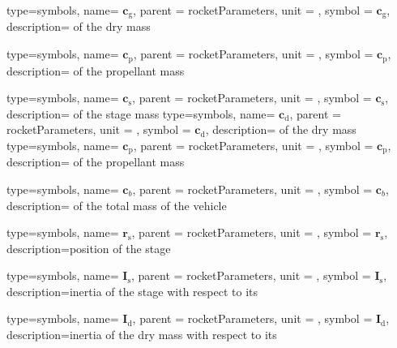 {type=symbols,
  name= \ensuremath{\mathbf{c}_\mathrm{g}},
  parent = {rocketParameters},
  unit = \unexpanded{\si{\meter}},
  symbol = \ensuremath{\mathbf{c}_\mathrm{g}},
  description={ of the dry mass}
}

{type=symbols,
  name= \ensuremath{\mathbf{c}_\mathrm{p}},
  parent = {rocketParameters},
  unit = \unexpanded{\si{\meter}},
  symbol = \ensuremath{\mathbf{c}_\mathrm{p}},
  description={ of the propellant mass}
}

{type=symbols,
  name= \ensuremath{\mathbf{c}_\mathrm{s}},
  parent = {rocketParameters},
  unit = \unexpanded{\si{\meter}},
  symbol = \ensuremath{\mathbf{c}_\mathrm{s}},
  description={ of the stage mass}
}
{type=symbols,
  name= \ensuremath{\mathbf{c}_\mathrm{d}},
  parent = {rocketParameters},
  unit = \unexpanded{\si{\meter}},
  symbol = \ensuremath{\mathbf{c}_\mathrm{d}},
  description={ of the dry mass}
}
{type=symbols,
  name= \ensuremath{\mathbf{c}_\mathrm{p}},
  parent = {rocketParameters},
  unit = \unexpanded{\si{\meter}},
  symbol = \ensuremath{\mathbf{c}_\mathrm{p}},
  description={ of the propellant mass}
}

{type=symbols,
  name= \ensuremath{{\mathbf{c}}_{b}},
  parent = {rocketParameters},
  unit = \unexpanded{\si{\meter}},
  symbol = \ensuremath{{\mathbf{c}}_{b}},
  description={ of the total mass of the vehicle}
}

{type=symbols,
  name= \ensuremath{\mathbf{r}_\mathrm{s}},
  parent = {rocketParameters},
  unit = \unexpanded{\si{\meter}},
  symbol = \ensuremath{\mathbf{r}_\mathrm{s}},
  description={position of the stage}
}

{type=symbols,
  name= \ensuremath{\mathbf{I}_\mathrm{s}},
  parent = {rocketParameters},
  unit = \unexpanded{\si{\kilogram\meter\squared}},
  symbol = \ensuremath{\mathbf{I}_\mathrm{s}},
  description={inertia of the stage with respect to its }
}

  {type=symbols,
  name= \ensuremath{\mathbf{I}_\mathrm{d}},
  parent = {rocketParameters},
  unit = \unexpanded{\si{\kilogram\meter\squared}},
  symbol = \ensuremath{\mathbf{I}_\mathrm{d}},
  description={inertia of the dry mass with respect to its }
}


